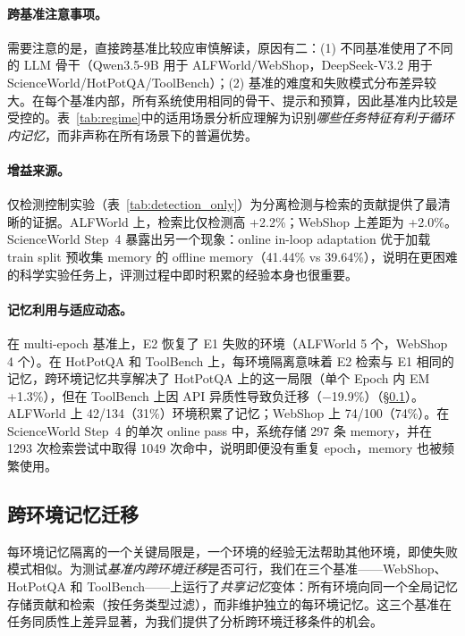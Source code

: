 \documentclass[11pt,a4paper]{article}
\begin{document}
\paragraph{跨基准注意事项。} 需要注意的是，直接跨基准比较应审慎解读，原因有二：(1) 不同基准使用了不同的 LLM 骨干（Qwen3.5-9B 用于 ALFWorld/WebShop，DeepSeek-V3.2 用于 ScienceWorld/HotPotQA/ToolBench）；(2) 基准的难度和失败模式分布差异较大。在每个基准内部，所有系统使用相同的骨干、提示和预算，因此基准内比较是受控的。表~\ref{tab:regime}中的适用场景分析应理解为识别\emph{哪些任务特征有利于循环内记忆}，而非声称在所有场景下的普遍优势。

\paragraph{增益来源。} 仅检测控制实验（表~\ref{tab:detection_only}）为分离检测与检索的贡献提供了最清晰的证据。ALFWorld 上，检索比仅检测高 +2.2\%；WebShop 上差距为 +2.0\%。ScienceWorld Step~4 暴露出另一个现象：online in-loop adaptation 优于加载 train split 预收集 memory 的 offline memory（41.44\% vs 39.64\%），说明在更困难的科学实验任务上，评测过程中即时积累的经验本身也很重要。

\paragraph{记忆利用与适应动态。} 在 multi-epoch 基准上，E2 恢复了 E1 失败的环境（ALFWorld 5 个，WebShop 4 个）。在 HotPotQA 和 ToolBench 上，每环境隔离意味着 E2 检索与 E1 相同的记忆，跨环境记忆共享解决了 HotPotQA 上的这一局限（单个 Epoch 内 EM +1.3\%），但在 ToolBench 上因 API 异质性导致负迁移（$-$19.9\%）（\S\ref{sec:cross_env}）。ALFWorld 上 42/134（31\%）环境积累了记忆；WebShop 上 74/100（74\%）。在 ScienceWorld Step~4 的单次 online pass 中，系统存储 297 条 memory，并在 1293 次检索尝试中取得 1049 次命中，说明即便没有重复 epoch，memory 也被频繁使用。

\subsection{跨环境记忆迁移}
\label{sec:cross_env}

每环境记忆隔离的一个关键局限是，一个环境的经验无法帮助其他环境，即使失败模式相似。为测试\emph{基准内跨环境迁移}是否可行，我们在三个基准——WebShop、HotPotQA 和 ToolBench——上运行了\emph{共享记忆}变体：所有环境向同一个全局记忆存储贡献和检索（按任务类型过滤），而非维护独立的每环境记忆。这三个基准在任务同质性上差异显著，为我们提供了分析跨环境迁移条件的机会。
\end{document}
